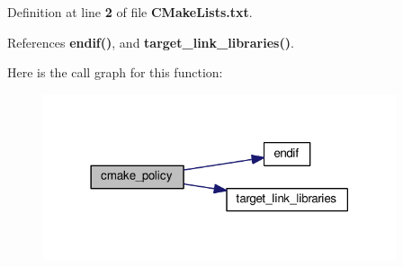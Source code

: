 Definition at line {\bf 2} of file {\bf C\+Make\+Lists.\+txt}.



References {\bf endif()}, and {\bf target\+\_\+link\+\_\+libraries()}.



Here is the call graph for this function\+:
\nopagebreak
\begin{figure}[H]
\begin{center}
\leavevmode
\includegraphics[width=294pt]{df/dc1/mcu__program_2CMakeLists_8txt_a6f9b6f9b140c2e81bf682fdfe9a35e33_cgraph}
\end{center}
\end{figure}


